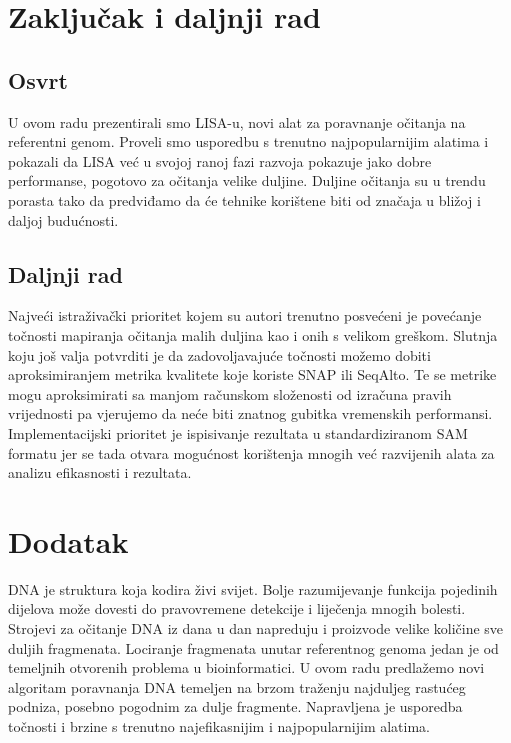 \documentclass[times, utf8, diplomski]{fer}
\begin{document}
\chapter{Zaključak i daljnji rad}

\section{Osvrt}
U ovom radu prezentirali smo LISA-u, novi alat za poravnanje očitanja na referentni genom. Proveli smo usporedbu s trenutno najpopularnijim alatima i pokazali da LISA već u svojoj ranoj fazi razvoja pokazuje jako dobre performanse, pogotovo za očitanja velike duljine. Duljine očitanja su u trendu porasta tako da predviđamo da će tehnike korištene biti od značaja u bližoj i daljoj budućnosti.

\section{Daljnji rad}
Najveći istraživački prioritet kojem su autori trenutno posvećeni je povećanje točnosti mapiranja očitanja malih duljina kao i onih s velikom greškom. Slutnja koju još valja potvrditi je da zadovoljavajuće točnosti možemo dobiti aproksimiranjem metrika kvalitete koje koriste SNAP ili SeqAlto. Te se metrike mogu aproksimirati sa manjom računskom složenosti od izračuna pravih vrijednosti pa vjerujemo da neće biti znatnog gubitka vremenskih performansi.\\
Implementacijski prioritet je ispisivanje rezultata u standardiziranom SAM formatu jer se tada otvara mogućnost korištenja mnogih već razvijenih alata za analizu efikasnosti i rezultata.

\chapter{Dodatak}




\begin{sazetak}

DNA je struktura koja kodira živi svijet. Bolje razumijevanje funkcija pojedinih dijelova može dovesti do pravovremene detekcije i liječenja mnogih bolesti. Strojevi za očitanje DNA iz dana u dan napreduju i proizvode velike količine sve duljih fragmenata. Lociranje fragmenata unutar referentnog genoma jedan je od temeljnih otvorenih problema u bioinformatici. U ovom radu predlažemo novi algoritam poravnanja DNA temeljen na brzom traženju najduljeg rastućeg podniza, posebno pogodnim za dulje fragmente. Napravljena je usporedba točnosti i brzine s trenutno najefikasnijim i najpopularnijim alatima.

\end{sazetak}
\end{document}
